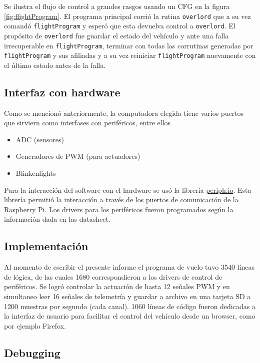 Se ilustra el flujo de control a grandes rasgos usando un CFG en la figura \ref{fig:flightProgram}. El programa principal corrió la rutina \texttt{overlord} que a su vez comandó \texttt{flightProgram} y esperó que esta devuelva control a \texttt{overlord}. El propósito de \texttt{overlord} fue guardar el estado del vehículo y ante una falla irrecuperable en \texttt{flightProgram}, terminar con todas las corrutinas generadas por \texttt{flightProgram} y sus afiliadas y a su vez reiniciar \texttt{flightProgram} nuevamente con el último estado antes de la falla.


\subsection{Interfaz con hardware}

Como se mencionó anteriormente, la computadora elegida tiene varios puertos que sirviern como interfases con periféricos, entre ellos 

\begin{itemize}
    \item ADC (sensores)
    \item Generadores de PWM (para actuadores)
    \item Blinkenlights
\end{itemize}

Para la interacción del software con el hardware se usó la librería \href{https://periph.io}{periph.io}. Esta librería permitió la interacción a través de los puertos de comunicación de la Raspberry Pi. Los drivers para los periféricos fueron programados según la información dada en las datasheet.


\subsection{Implementación}

Al momento de escribir el presente informe el programa de vuelo tuvo 3540 líneas de lógica, de las cuales 1680 correspondieron a los drivers de control de periféricos. Se logró controlar la actuación de hasta 12 señales PWM y en simultaneo leer 16 señales de telemetría y guardar a archivo en una tarjeta SD a 1200 muestras por segundo (cada canal). 1060 líneas de código fueron dedicadas a la interfaz de usuario para facilitar el control del vehículo desde un browser, como por ejemplo Firefox.

\subsection{Debugging}


